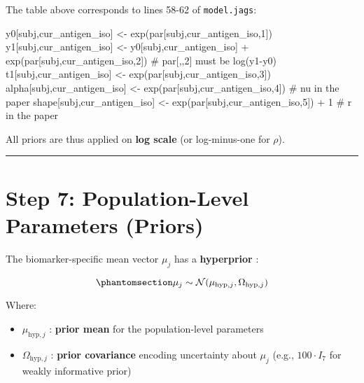 \documentclass[
]{article}
\newenvironment{Shaded}{\begin{snugshade}}{\end{snugshade}}
\newcommand{\CommentTok}[1]{\textcolor[rgb]{0.37,0.37,0.37}{#1}}
\newcommand{\DecValTok}[1]{\textcolor[rgb]{0.68,0.00,0.00}{#1}}
\newcommand{\FunctionTok}[1]{\textcolor[rgb]{0.28,0.35,0.67}{#1}}
\newcommand{\NormalTok}[1]{\textcolor[rgb]{0.00,0.23,0.31}{#1}}
\newcommand{\OtherTok}[1]{\textcolor[rgb]{0.00,0.23,0.31}{#1}}
\newcommand{\SpecialCharTok}[1]{\textcolor[rgb]{0.37,0.37,0.37}{#1}}
\providecommand{\tightlist}{%
  \setlength{\itemsep}{0pt}\setlength{\parskip}{0pt}}\usepackage{longtable,booktabs,array}
\begin{document}
The table above corresponds to lines 58-62 of \texttt{model.jags}:

\begin{Shaded}
\begin{Highlighting}[numbers=left,,firstnumber=58,]
\NormalTok{   y0[subj,cur\_antigen\_iso]    }\OtherTok{\textless{}{-}} \FunctionTok{exp}\NormalTok{(par[subj,cur\_antigen\_iso,}\DecValTok{1}\NormalTok{])}
\NormalTok{   y1[subj,cur\_antigen\_iso]    }\OtherTok{\textless{}{-}}\NormalTok{ y0[subj,cur\_antigen\_iso] }\SpecialCharTok{+} \FunctionTok{exp}\NormalTok{(par[subj,cur\_antigen\_iso,}\DecValTok{2}\NormalTok{]) }\CommentTok{\# par[,,2] must be log(y1{-}y0)}
\NormalTok{   t1[subj,cur\_antigen\_iso]    }\OtherTok{\textless{}{-}} \FunctionTok{exp}\NormalTok{(par[subj,cur\_antigen\_iso,}\DecValTok{3}\NormalTok{])}
\NormalTok{   alpha[subj,cur\_antigen\_iso] }\OtherTok{\textless{}{-}} \FunctionTok{exp}\NormalTok{(par[subj,cur\_antigen\_iso,}\DecValTok{4}\NormalTok{]) }\CommentTok{\# \textasciigrave{}nu\textasciigrave{} in the paper}
\NormalTok{   shape[subj,cur\_antigen\_iso] }\OtherTok{\textless{}{-}} \FunctionTok{exp}\NormalTok{(par[subj,cur\_antigen\_iso,}\DecValTok{5}\NormalTok{]) }\SpecialCharTok{+} \DecValTok{1} \CommentTok{\# \textasciigrave{}r\textasciigrave{} in the paper}
\end{Highlighting}
\end{Shaded}

All priors are thus applied on \textbf{log scale} (or log-minus-one for
\(\rho\)).

\begin{center}\rule{0.5\linewidth}{0.5pt}\end{center}

\section{Step 7: Population-Level Parameters
(Priors)}\label{step-7-population-level-parameters-priors}

The biomarker-specific mean vector \(\mu_j\) has a \textbf{hyperprior} :

\begin{equation}\phantomsection\label{eq-11}{
\mu_j \sim \mathcal{N}(\mu_{\text{hyp},j}, \Omega_{\text{hyp},j})
}\end{equation}

Where:

\begin{itemize}
\tightlist
\item
  \(\mu_{\text{hyp},j}\) : \textbf{prior mean} for the population-level
  parameters\\
\item
  \(\Omega_{\text{hyp},j}\) : \textbf{prior covariance} encoding
  uncertainty about \(\mu_j\) (e.g., \(100 \cdot I_7\) for weakly
  informative prior)
\end{itemize}
\end{document}
